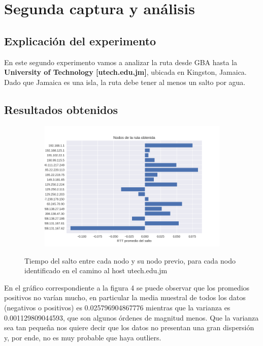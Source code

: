 \section{Segunda captura y análisis}

\subsection{Explicación del experimento}
\par En este segundo experimento vamos a analizar la ruta desde GBA hasta la \textbf{University of Technology [utech.edu.jm]}, ubicada en Kingston, Jamaica. Dado que Jamaica es una isla, la ruta debe tener al menos un salto por agua.

\subsection{Resultados obtenidos}

\begin{figure}[h!]
  \begin{subfigure}[b]{.5\textwidth}
    \includegraphics[width=\textwidth]{Imagenes/jamaica_rtts.png}
  \end{subfigure}
  \label{fig:jamaica_rtts}
  \caption{Tiempo del salto entre cada nodo y su nodo previo, para cada nodo identificado en el camino al host utech.edu.jm}
\end{figure}

\par En el gráfico correspondiente a la figura 4 se puede observar que los promedios positivos no varían mucho, en particular la media muestral de todos los datos (negativos o positivos) es 0.025796904867776 mientras que la varianza es 0.001129809044593, que son algunos órdenes de magnitud menos. Que la varianza sea tan pequeña nos quiere decir que los datos no presentan una gran dispersión y, por ende, no es muy probable que haya outliers.

